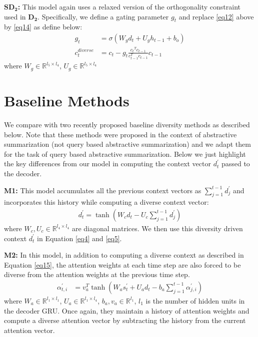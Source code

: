 \documentclass[11pt]{article}
\begin{document}
\noindent\textbf{$\mathbf{SD_2}$:} This model again uses a relaxed version of the orthogonality constraint used in \textbf{$\mathbf{D_2}$}. Specifically, we define a gating parameter $g_t$ and replace \eqref{eq12} above by \eqref{eq14} as define below:
\begin{align}
\label{eq14}
\nonumber g_t &= \sigma(W_{g}d_{t} + U_{g}h_{t-1} + b_{o})\\
c_t^{diverse} &= {c_t} - {g_t}\frac{{c_t}^T c_{t-1}}{c_{t-1}^{T}c_{t-1}} c_{t-1}
\end{align}
where $W_{g} \in \mathbb{R}^{l_{5} \times l_{4}}$, $U_{g} \in \mathbb{R}^{l_{5} \times l_{4}}$ 


\section{Baseline Methods}
We compare with two recently proposed baseline diversity methods \cite{chen2016distraction} as described below. Note that these methods were proposed in the context of abstractive summarization (not query based abstractive summarization) and we adapt them for the task of query based abstractive summarization. Below we just highlight the key differences from our model in computing the context vector $d_t^{'}$ passed to the decoder.

\noindent\textbf{M1:} This model accumulates all the previous context vectors as $\sum_{j=1}^{t-1}d_j^{'}$ and incorporates this history while computing a diverse context vector:
\begin{align}
\label{eq15}
d_t^{'} = \tanh(W_cd_t - U_c \sum_{j=1}^{t-1}d_j^{'})
\end{align}
where $W_c, U_c \in \mathbb{R}^{l_{4} \times l_{4}}$ are diagonal matrices.
We then use this diversity driven context $d_t^{'}$ in Equation \eqref{eq4} and \eqref{eq5}.

\noindent\textbf{M2:} In this model, in addition to computing a diverse context as described in Equation \eqref{eq15}, the attention weights at each time step are also forced to be diverse from the attention weights at the previous time step. 
\begin{align}
\nonumber \alpha_{t,i}^{'} &= v_a^T \tanh(W_as_t^{'} + U_ad_t - b_a\sum_{j=1}^{t-1} \alpha_{j,i}^{'})
\end{align}
where $W_{a} \in \mathbb{R}^{l_{1} \times l_{1}}$, $U_{a} \in \mathbb{R}^{l_{1} \times  l_{4}}$, $b_{a}, v_{a} \in \mathbb{R}^{l_1}$, $l_{1}$ is the number of hidden units in the decoder GRU. Once again, they maintain a history of attention weights and compute a diverse attention vector by subtracting the history from the current attention vector. 
\end{document}
